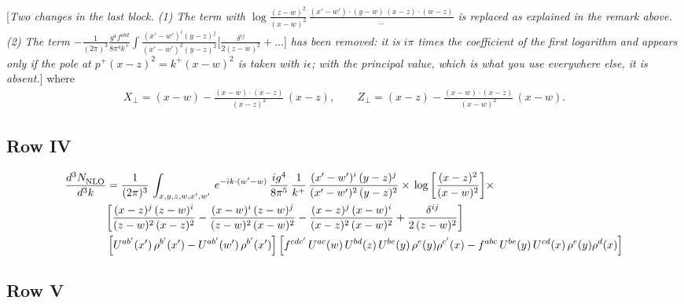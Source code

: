 \documentclass[9pt]{article}
\numberwithin{equation}{section}
\newcommand{\rnote}[1]{{\color{teal}[\textit{#1}]}}
\begin{document}
\rnote{Two changes in the last block. (1) The term with $\log\frac{(z-w)^{2}}{(x-w)^{2}}\,\frac{(x'-w')\cdot(y-w)\,(x-z)\cdot(w-z)}{\ldots}$ is replaced as explained in the remark above. (2) The term $-\frac{1}{(2\pi)^{3}}\frac{g^{4}f^{abd}}{8\pi^{4}k^{+}}\int\frac{(x'-w')^{i}(y-z)^{j}}{(x'-w')^{2}(y-z)^{2}}\big[\frac{\delta^{ij}}{2(z-w)^{2}}+\ldots\big]$ has been removed: it is $i\pi$ times the coefficient of the first logarithm and appears only if the pole at $p^{+}(x-z)^{2}=k^{+}(x-w)^{2}$ is taken with $i\epsilon$; with the principal value, which is what you use everywhere else, it is absent.}
where
\begin{align}
X_{\perp}=(x-w)-\frac{(x-w)\cdot(x-z)}{(x-z)^{2}}\,(x-z),\qquad
Z_{\perp}=(x-z)-\frac{(x-w)\cdot(x-z)}{(x-w)^{2}}\,(x-w).
\end{align}

\subsection{Row IV}
\begin{align}
    \frac{d^{3}N_{\rm NLO}^{\rm}}{d^{3}k}  & =   \frac{1}{(2\pi)^{3}}\,
    \int_{x,y,z,w,x',w'}\,e^{-ik\cdot (w^\prime-w)}\, \frac{ig^{4}}{8\pi^{5}}\,\frac{1}{k^{+}}\,\frac{(x'-w')^{i}\,(y-z)^{j}}{(x'-w')^{2}\,(y-z)^{2}}\times\,\log{\left[\frac{(x-z)^{2}}{(x-w)^{2}}\right]}\times\notag \\ &  \bigg[\frac{(x-z)^{j}\,(z-w)^{i}}{(z-w)^{2}\,(x-z)^{2}} -\frac{(x-w)^{i}\,(z-w)^{j}}{(z-w)^{2}\,(x-w)^{2}}-\frac{(x-z)^{j}\,(x-w)^{i}}{(x-z)^{2}\,(x-w)^{2}}+\frac{\delta^{ij}}{2\,(z-w)^{2}}\bigg]\notag \\ &  \left[U^{ab'}(x')\,\rho^{b'}(x')-U^{ab'}(w')\,\rho^{b'}(x')\right] \left[f^{cdc'}\,U^{ac}(w)\,U^{bd}(z)\,U^{be}(y)\,\rho^{e}(y)\rho^{c'}(x)-f^{abc}\,U^{be}(y)\,U^{cd}(x)\,\rho^{e}(y)\rho^{d}(x)\right]
\end{align}
\subsection{Row V}
\end{document}

